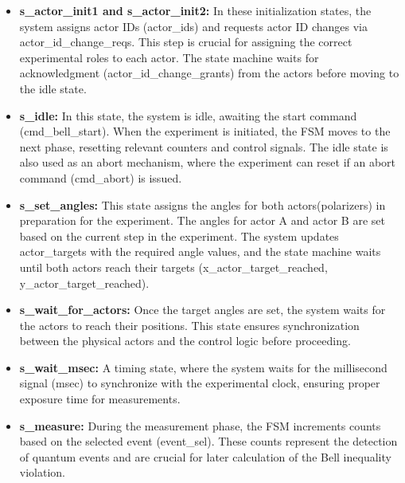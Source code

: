 \begin{itemize}

\item \textbf{s\_actor\_init1 and s\_actor\_init2:\newline }
In these initialization states, the system assigns actor IDs (actor\_ids) and requests actor ID changes via actor\_id\_change\_reqs. This step is crucial for assigning the correct experimental roles to each actor. The state machine waits for acknowledgment (actor\_id\_change\_grants) from the actors before moving to the idle state.

\item \textbf{s\_idle: \newline}
In this state, the system is idle, awaiting the start command (cmd\_bell\_start). When the experiment is initiated, the \acs{FSM} moves to the next phase, resetting relevant counters and control signals. The idle state is also used as an abort mechanism, where the experiment can reset if an abort command (cmd\_abort) is issued.

\item \textbf{s\_set\_angles: \newline}
This state assigns the angles for both actors(polarizers) in preparation for the experiment. The angles for actor A and actor B are set based on the current step in the experiment. The system updates actor\_targets with the required angle values, and the state machine waits until both actors reach their targets (x\_actor\_target\_reached, y\_actor\_target\_reached).

\item \textbf{s\_wait\_for\_actors: \newline}
Once the target angles are set, the system waits for the actors to reach their positions. This state ensures synchronization between the physical actors and the control logic before proceeding.

\item \textbf{s\_wait\_msec: \newline}
A timing state, where the system waits for the millisecond signal (msec) to synchronize with the experimental clock, ensuring proper exposure time for measurements.

\item \textbf{s\_measure:\newline}
During the measurement phase, the \acs{FSM} increments counts based on the selected event (event\_sel). These counts represent the detection of quantum events and are crucial for later calculation of the Bell inequality violation.


\end{itemize}

